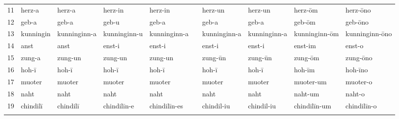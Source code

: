 \begin{table}[H]
{\begin{tabular}{rlllllllll}
		11 & herz-a & herz-a & herz-in & herz-in &                       & herz-un & herz-un & herz-\=om & herz-\=ono\\
		12 & geb-a  & geb-a & geb-u & geb-a &                            & geb-a & geb-a & geb-\=om & geb-\=ono\\
		13 & kunningin  & kunninginn-a & kunninginn-u & kunninginn-a &   & kunninginn-a & kunninginn-a & kunninginn-\=om & kunninginn-\=ono\\
		14 & anst       & anst & enst-i & enst-i &                       & enst-i & enst-i & enst-im & enst-o\\
		15 & zung-a     & zung-un & zung-un & zung-un &                  & zung-\=un & zung-\=un & zung-\=om & zung-\=ono\\
		16 & hoh-\=i    & hoh-\=i & hoh-\=i & hoh-\=i &                  & hoh-\=i & hoh-\=i & hoh-\=im & hoh-\=ino\\
		17 & muoter     & muoter & muoter & muoter &                     & muoter & muoter & muoter-um & muoter-o\\
		18 & naht       & naht & naht & naht &                           & naht & naht & naht-um & naht-o\\
		19 & chindil\=i & chindil\=i & chindil\=in-e & chindil\=in-es &  &  chindil-iu & chindil-iu & chindil\=in-um & chindil\=in-o\\
\lspbottomrule
	\end{tabular}}
\end{table}


